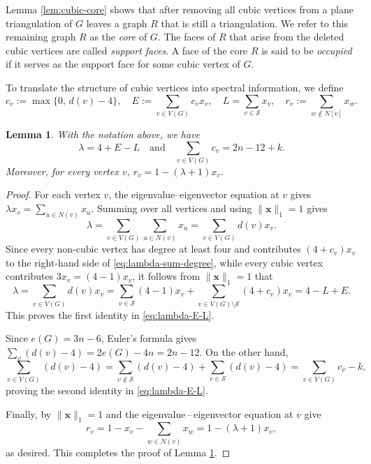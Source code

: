 \documentclass[11pt]{article}
\theoremstyle{plain}
\newtheorem{lemma}{Lemma}[section]
\theoremstyle{definition}
\numberwithin{equation}{section}
\begin{document}
Lemma \ref{lem:cubic-core} shows that after removing all cubic vertices from a plane triangulation 
of $G$ leaves a graph $R$ that is still a triangulation. We refer to this remaining graph $R$ as 
the \emph{core} of $G$. The faces of $R$ that arise from the deleted cubic vertices are called \emph{support faces}. 
A face of the core $R$ is said to be \emph{occupied} if it serves as the support face for some cubic vertex of $G$.

To translate the structure of cubic vertices into spectral information, we define
\[
c_v:= \max\{0,\, d(v) - 4\}, \quad E:= \sum_{v\in V(G)} c_vx_v, \quad 
L = \sum_{v\in\mathcal{S}} x_v, \quad r_v:= \sum_{w\notin N[v]} x_w.
\]

\begin{lemma}\label{lem:identities}
With the notation above, we have
\begin{equation}\label{eq:lambda-E-L}
\lambda = 4 + E - L \quad \text{and} \quad
\sum_{v\in V(G)} c_v = 2n - 12 + k.
\end{equation}
Moreover, for every vertex $v$, $r_v = 1 - (\lambda + 1) x_v$.
\end{lemma}

\begin{proof}
For each vertex $v$, the eigenvalue--eigenvector equation at $v$ gives $\lambda x_v = \sum_{u\in N(v)} x_u$. 
Summing over all vertices and using $\|\bm{x}\|_1 = 1$ gives
\begin{equation}\label{eq:lambda-sum-degree}
 \lambda = \sum_{v\in V(G)} \sum_{u\in N(v)} x_u = \sum_{v\in V(G)} d(v)x_v.
\end{equation}
Since every non-cubic vertex has degree at least four and contributes
$(4 + c_v) x_v$ to the right-hand side of \eqref{eq:lambda-sum-degree}, while every cubic vertex 
contributes $3x_v=(4-1)x_v$, it follows from $\|\bm{x}\|_1 = 1$ that
\[
 \lambda = \sum_{v\in V(G)} d(v)x_v = \sum_{v\in \mathcal{S}} (4-1)x_v + \sum_{v\in V(G)\setminus\mathcal{S}} (4 + c_v) x_v
 = 4 - L + E.
\]
This proves the first identity in \eqref{eq:lambda-E-L}.

Since $e(G) = 3n - 6$, Euler's formula gives $\sum_v (d(v)-4) = 2e(G) - 4n = 2n - 12$. On the other hand,
\[
\sum_{v\in V(G)} (d(v)-4) = \sum_{v\notin \mathcal{S}} (d(v) - 4) + \sum_{v\in\mathcal{S}} (d(v) - 4) 
= \sum_{v\in V(G)} c_v - k, 
\]
proving the second identity in \eqref{eq:lambda-E-L}.

Finally, by $\|\bm{x}\|_1 = 1$ and the eigenvalue\,--\,eigenvector equation at $v$ give
\[
r_v = 1 - x_v - \sum_{w\in N(v)} x_w = 1 - (\lambda + 1) x_v,
\]
as desired. This completes the proof of Lemma \ref{lem:identities}.
\end{proof}
\end{document}
